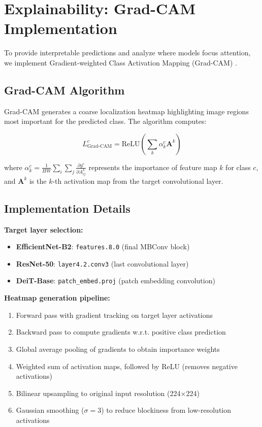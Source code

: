 \section{Explainability: Grad-CAM Implementation}

To provide interpretable predictions and analyze where models focus attention, we implement Gradient-weighted Class Activation Mapping (Grad-CAM) \cite{selvaraju2017grad}.

\subsection{Grad-CAM Algorithm}

Grad-CAM generates a coarse localization heatmap highlighting image regions most important for the predicted class. The algorithm computes:

\begin{equation}
L^c_{\text{Grad-CAM}} = \text{ReLU}\left(\sum_k \alpha_k^c \mathbf{A}^k\right)
\end{equation}

where $\alpha_k^c = \frac{1}{HW} \sum_i \sum_j \frac{\partial y^c}{\partial A^k_{ij}}$ represents the importance of feature map $k$ for class $c$, and $\mathbf{A}^k$ is the $k$-th activation map from the target convolutional layer.

\subsection{Implementation Details}

\textbf{Target layer selection:}
\begin{itemize}
    \item \textbf{EfficientNet-B2}: \texttt{features.8.0} (final MBConv block)
    \item \textbf{ResNet-50}: \texttt{layer4.2.conv3} (last convolutional layer)
    \item \textbf{DeiT-Base}: \texttt{patch\_embed.proj} (patch embedding convolution)
\end{itemize}

\textbf{Heatmap generation pipeline:}
\begin{enumerate}
    \item Forward pass with gradient tracking on target layer activations
    \item Backward pass to compute gradients w.r.t. positive class prediction
    \item Global average pooling of gradients to obtain importance weights
    \item Weighted sum of activation maps, followed by ReLU (removes negative activations)
    \item Bilinear upsampling to original input resolution (224×224)
    \item Gaussian smoothing ($\sigma=3$) to reduce blockiness from low-resolution activations
\end{enumerate}

